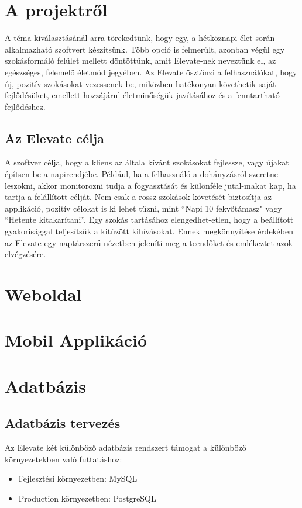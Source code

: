 \documentclass[12pt]{report}
\begin{document}


\setcounter{tocdepth}{3}
\tableofcontents

\chapter{A projektről}
\begin{sloppypar}
A téma kiválasztásánál arra törekedtünk, hogy egy, a hétköznapi élet során alkalmazható szoftvert készítsünk. Több opció is felmerült, azonban végül egy szokásformáló felület mellett döntöttünk, amit Elevate-nek neveztünk el, az egészséges, felemelő életmód jegyében. Az Elevate ösztönzi a felhasználókat, hogy új, pozitív szokásokat vezessenek be, miközben hatékonyan követhetik saját fejlődésüket, emellett hozzájárul életminőségük javításához és a fenntartható fejlődéshez.
\end{sloppypar}
\section{Az Elevate célja}
\begin{sloppypar}
A szoftver célja, hogy a kliens az általa kívánt szokásokat fejlessze, vagy újakat építsen be a napirendjébe. Például, ha a felhasználó a dohányzásról szeretne leszokni, akkor monitorozni tudja a fogyasztását és különféle jutal-makat kap, ha tartja a felállított célját. Nem csak a rossz szokások követését biztosítja az applikáció, pozitív célokat is ki lehet tűzni, mint “Napi 10 fekvőtámasz" vagy “Hetente kitakarítani”. Egy szokás tartásához elengedhet-etlen, hogy a beállított gyakorisággal teljesítsük a kitűzött kihívásokat. Ennek megkönnyítése érdekében az Elevate egy naptárszerű nézetben jeleníti meg a teendőket és emlékeztet azok elvégzésére. 
\end{sloppypar}
\chapter{Weboldal}
\chapter{Mobil Applikáció}
\chapter{Adatbázis}
\section{Adatbázis tervezés}
Az Elevate két különböző adatbázis rendszert támogat a különböző környezetekben való futtatáshoz:
\begin{itemize}
  \item Fejlesztési környezetben: MySQL
  \item Production környezetben: PostgreSQL
\end{itemize}
\end{document}
